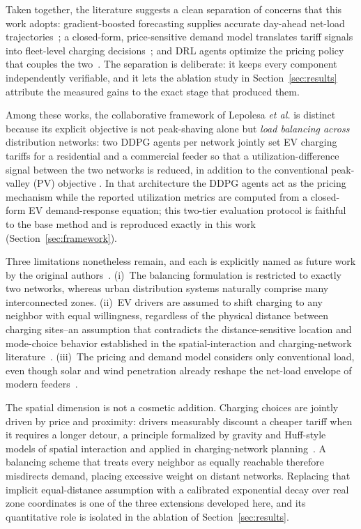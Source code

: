 \documentclass[10pt,journal]{IEEEtran}
\begin{document}
Taken together, the literature suggests a clean separation of concerns that
this work adopts: gradient-boosted forecasting supplies accurate day-ahead
net-load trajectories~\cite{chen2016,ke2017,hong2016,wang2016recency}; a
closed-form, price-sensitive demand model translates tariff signals into
fleet-level charging decisions~\cite{lepolesa2026}; and DRL agents optimize
the pricing policy that couples the
two~\cite{lillicrap2016,haarnoja2018}. The separation is deliberate: it
keeps every component independently verifiable, and it lets the ablation
study in Section~\ref{sec:results} attribute the measured gains to the
exact stage that produced them.

Among these works, the collaborative framework of Lepolesa \emph{et al.} is
distinct because its explicit objective is not peak-shaving alone but
\emph{load balancing across} distribution networks: two DDPG agents per
network jointly set EV charging tariffs for a residential and a commercial
feeder so that a utilization-difference signal between the two networks is
reduced, in addition to the conventional peak-valley (PV) objective
\cite{lepolesa2026}. In that architecture the DDPG agents act as the pricing
mechanism while the reported utilization metrics are computed from a
closed-form EV demand-response equation; this two-tier evaluation protocol
is faithful to the base method and is reproduced exactly in this work
(Section~\ref{sec:framework}).

Three limitations nonetheless remain, and each is explicitly named as
future work by the original authors~\cite{lepolesa2026}. (i)~The balancing
formulation is restricted to exactly two networks, whereas urban
distribution systems naturally comprise many interconnected zones.
(ii)~EV drivers are assumed to shift charging to any neighbor with equal
willingness, regardless of the physical distance between charging sites--an
assumption that contradicts the distance-sensitive location and mode-choice
behavior established in the spatial-interaction and charging-network
literature~\cite{huff1964,frade2011}. (iii)~The pricing and demand model
considers only conventional load, even though solar and wind penetration
already reshape the net-load envelope of modern
feeders~\cite{hoke2013}.

The spatial dimension is not a cosmetic addition. Charging choices are
jointly driven by price and proximity: drivers measurably discount a
cheaper tariff when it requires a longer detour, a principle formalized by
gravity and Huff-style models of spatial interaction and applied in
charging-network planning~\cite{huff1964,frade2011}. A balancing scheme
that treats every neighbor as equally reachable therefore misdirects
demand, placing excessive weight on distant networks. Replacing that
implicit equal-distance assumption with a calibrated exponential decay over
real zone coordinates is one of the three extensions developed here, and
its quantitative role is isolated in the ablation of
Section~\ref{sec:results}.
\end{document}
